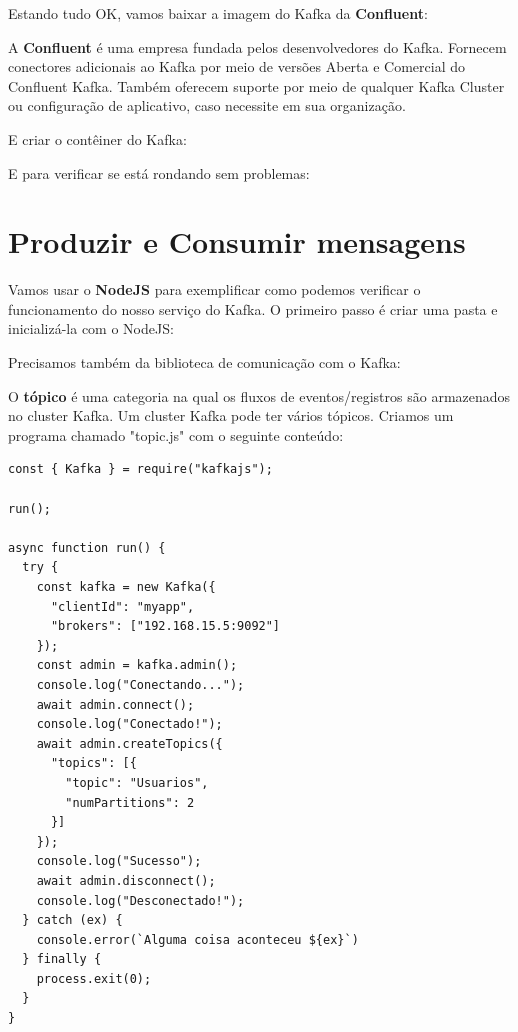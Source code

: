 \documentclass[a4paper,11pt]{article}
\begin{document}
Estando tudo OK, vamos baixar a imagem do Kafka da \textbf{Confluent}: \\

A \textbf{Confluent}\cite{confluentoficial} é uma empresa fundada pelos desenvolvedores do Kafka. Fornecem conectores adicionais ao Kafka por meio de versões Aberta e Comercial do Confluent Kafka. Também oferecem suporte por meio de qualquer Kafka Cluster ou configuração de aplicativo, caso necessite em sua organização.

E criar o contêiner do Kafka: \\

E para verificar se está rondando sem problemas: \\

\section{Produzir e Consumir mensagens}
Vamos usar o \textbf{NodeJS} para exemplificar como podemos verificar o funcionamento do nosso serviço do Kafka. O primeiro passo é criar uma pasta e inicializá-la com o NodeJS:

Precisamos também da biblioteca de comunicação com o Kafka:

O \textbf{tópico} é uma categoria na qual os fluxos de eventos/registros são armazenados no cluster Kafka. Um cluster Kafka pode ter vários tópicos. Criamos um programa chamado "topic.js" com o seguinte conteúdo:
\begin{lstlisting}[]
const { Kafka } = require("kafkajs");

run();

async function run() {
  try {
    const kafka = new Kafka({
      "clientId": "myapp",
      "brokers": ["192.168.15.5:9092"]
    });
    const admin = kafka.admin();
    console.log("Conectando...");
    await admin.connect();
    console.log("Conectado!");
    await admin.createTopics({
      "topics": [{
        "topic": "Usuarios",
        "numPartitions": 2
      }]
    });
    console.log("Sucesso");
    await admin.disconnect();
    console.log("Desconectado!");
  } catch (ex) {
    console.error(`Alguma coisa aconteceu ${ex}`)
  } finally {
    process.exit(0);
  }
}
\end{lstlisting}
\end{document}

